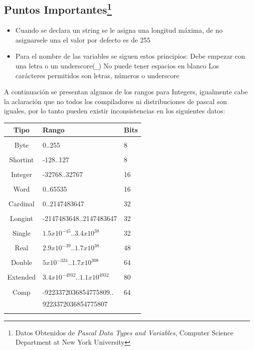 \documentclass[10pt,journal,compsoc]{IEEEtran}
\begin{document}
\subsection{Puntos Importantes\protect\footnote{Datos Obtenidos de \emph{Pascal Data Types and Variables}, Computer Science Department at New York University}}
\begin{itemize}
	\item Cuando se declara un string se le asigna una longitud m\'axima, de no asignarsele una el valor por defecto es de 255
	\item Para el nombre de las variables se siguen estos principios:
	\subitem *Debe empezar con una letra o un underscore(\verb|_|)
	\subitem *No puede tener espacios en blanco
	\subitem *Los car\'acteres permitidos son letras, n\'umeros o underscore
\end{itemize}
A continuaci\'on se presentan algunos de los rangos para Integers, igualmente cabe la aclaraci\'on que no todos los compiladores ni distribuciones de pascal son iguales, por lo tanto pueden existir inconsistencias en los siguientes datos:
\begin{tabular}{c p{5cm} p{1cm}}
	Tipo & Rango & Bits\\
	\hline\\
	Byte & 0..255 & 8\\
	\hline\\
	Shortint & -128..127 & 8\\
	\hline\\
	Integer & -32768..32767 & 16\\
	\hline\\
	Word & 0..65535 & 16\\
	\hline\\
	Cardinal & 0..2147483647 & 32\\
	\hline\\
	Longint & -2147483648..2147483647 & 32\\
	\hline\\
	Single & $1.5x10^{-45}$..$3.4x10^{38}$ & 32\\
	\hline\\
	Real & $2.9x10^{-39}$..$1.7x10^{38}$ & 48\\
	\hline\\
	Double & $5x10^{-324}$..$1.7x10^{308}$ & 64\\
	\hline\\
	Extended & $3.4x10^{-4932}$..$1.1x10^{4932}$ & 80\\
	\hline\\
	Comp & -9223372036854775809.. & 64\\
	     & 9223372036854775807 &     \\
	\hline\\
\end{tabular}
\end{document}
